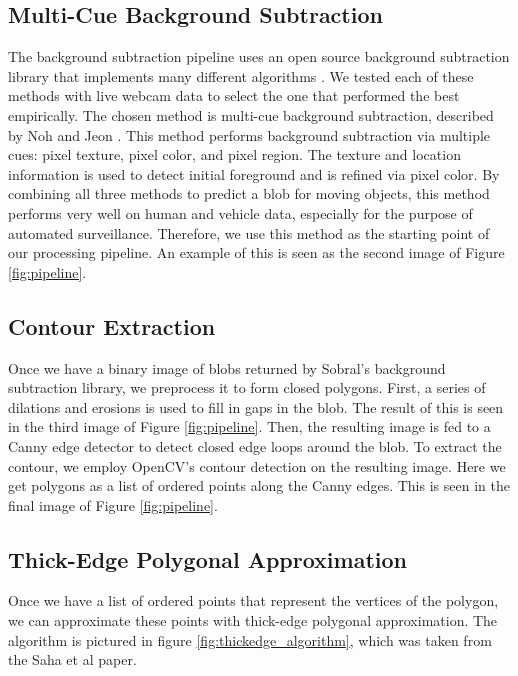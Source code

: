 \documentclass[10pt,twocolumn,letterpaper]{article}
\begin{document}
\subsection{Multi-Cue Background Subtraction}

The background subtraction pipeline uses an open source background subtraction library that implements many different
algorithms \cite{bgslibrary}. We tested each of these methods with live webcam data to select the one that performed the
best empirically. The chosen method is multi-cue background subtraction, described by Noh and Jeon \cite{Noh2013}. This
method performs background subtraction via multiple cues: pixel texture, pixel color, and pixel region. The texture and
location information is used to detect initial foreground and is refined via pixel color. By combining all three methods
to predict a blob for moving objects, this method performs very well on human and vehicle data, especially for the
purpose of automated surveillance. Therefore, we use this method as the starting point of our processing pipeline. An
example of this is seen as the second image of Figure \ref{fig:pipeline}.

\subsection{Contour Extraction}

Once we have a binary image of blobs returned by Sobral's background subtraction library, we preprocess it to form
closed polygons. First, a series of dilations and erosions is used to fill in gaps in the blob. The result of this is
seen in the third image of Figure \ref{fig:pipeline}. Then, the resulting image is fed to a Canny edge detector to
detect closed edge loops around the blob. To extract the contour, we employ OpenCV's contour detection on the resulting
image. Here we get polygons as a list of ordered points along the Canny edges. This is seen in the final image of Figure
\ref{fig:pipeline}.

\subsection{Thick-Edge Polygonal Approximation}

Once we have a list of ordered points that represent the vertices of the polygon, we can approximate these points with
thick-edge polygonal approximation. The algorithm is pictured in figure \ref{fig:thickedge_algorithm}, which was taken
from the Saha et al \cite{Saha2017} paper.
\end{document}
